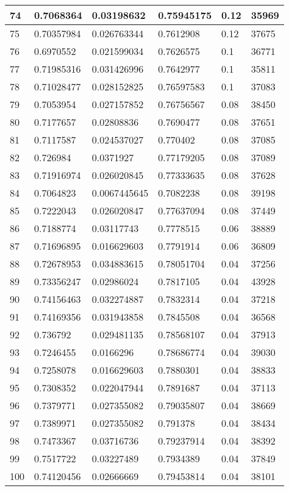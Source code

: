 \begin{longtable}{|l|l|l|l|l|l|}
74 & 0.7068364 & 0.03198632 & 0.75945175 & 0.12 & 35969 \\ \hline 
75 & 0.70357984 & 0.026763344 & 0.7612908 & 0.12 & 37675 \\ \hline 
76 & 0.6970552 & 0.021599034 & 0.7626575 & 0.1 & 36771 \\ \hline 
77 & 0.71985316 & 0.031426996 & 0.7642977 & 0.1 & 35811 \\ \hline 
78 & 0.71028477 & 0.028152825 & 0.76597583 & 0.1 & 37083 \\ \hline 
79 & 0.7053954 & 0.027157852 & 0.76756567 & 0.08 & 38450 \\ \hline 
80 & 0.7177657 & 0.02808836 & 0.7690477 & 0.08 & 37651 \\ \hline 
81 & 0.7117587 & 0.024537027 & 0.770402 & 0.08 & 37085 \\ \hline 
82 & 0.726984 & 0.0371927 & 0.77179205 & 0.08 & 37089 \\ \hline 
83 & 0.71916974 & 0.026020845 & 0.77333635 & 0.08 & 37628 \\ \hline 
84 & 0.7064823 & 0.0067445645 & 0.7082238 & 0.08 & 39198 \\ \hline 
85 & 0.7222043 & 0.026020847 & 0.77637094 & 0.08 & 37449 \\ \hline 
86 & 0.7188774 & 0.03117743 & 0.7778515 & 0.06 & 38889 \\ \hline 
87 & 0.71696895 & 0.016629603 & 0.7791914 & 0.06 & 36809 \\ \hline 
88 & 0.72678953 & 0.034883615 & 0.78051704 & 0.04 & 37256 \\ \hline 
89 & 0.73356247 & 0.02986024 & 0.7817105 & 0.04 & 43928 \\ \hline 
90 & 0.74156463 & 0.032274887 & 0.7832314 & 0.04 & 37218 \\ \hline 
91 & 0.74169356 & 0.031943858 & 0.7845508 & 0.04 & 36568 \\ \hline 
92 & 0.736792 & 0.029481135 & 0.78568107 & 0.04 & 37913 \\ \hline 
93 & 0.7246455 & 0.0166296 & 0.78686774 & 0.04 & 39030 \\ \hline 
94 & 0.7258078 & 0.016629603 & 0.7880301 & 0.04 & 38833 \\ \hline 
95 & 0.7308352 & 0.022047944 & 0.7891687 & 0.04 & 37113 \\ \hline 
96 & 0.7379771 & 0.027355082 & 0.79035807 & 0.04 & 38669 \\ \hline 
97 & 0.7389971 & 0.027355082 & 0.791378 & 0.04 & 38434 \\ \hline 
98 & 0.7473367 & 0.03716736 & 0.79237914 & 0.04 & 38392 \\ \hline 
99 & 0.7517722 & 0.03227489 & 0.7934389 & 0.04 & 37849 \\ \hline 
100 & 0.74120456 & 0.02666669 & 0.79453814 & 0.04 & 38101 \\ \hline 
\end{longtable}